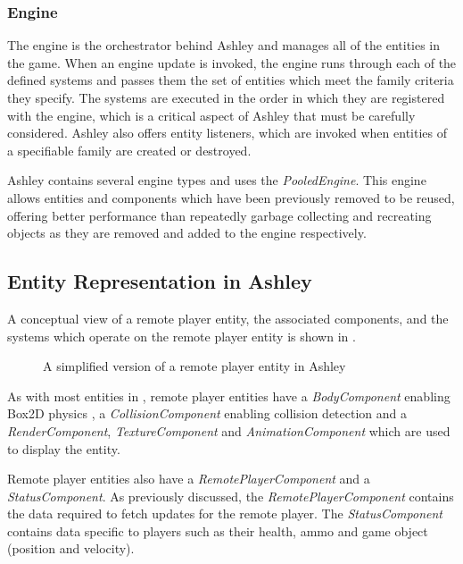 \subsubsection{Engine}
The engine is the orchestrator behind Ashley and manages all of the entities in the game. When an engine update is invoked, the engine runs through each of the defined systems and passes them the set of entities which meet the family criteria they specify. The systems are executed in the order in which they are registered with the engine, which is a critical aspect of Ashley that must be carefully considered. Ashley also offers entity listeners, which are invoked when entities of a specifiable family are created or destroyed.

Ashley contains several engine types and \game{} uses the \textit{PooledEngine}. This engine allows entities and components  which have been previously removed to be reused, offering better performance than repeatedly garbage collecting and recreating objects as they are removed and added to the engine respectively. 
 
\subsection{Entity Representation in Ashley}
A conceptual view of a remote player entity, the associated components, and the systems which operate on the remote player entity is shown in . 

\begin{figure}[H]
    \centering
    \caption{A simplified version of a remote player entity in Ashley}
    \label{fig:impl:ashley}
\end{figure}

As with most entities in \game{}, remote player entities have a \textit{BodyComponent} enabling Box2D physics , a \textit{CollisionComponent} enabling collision detection and a \textit{RenderComponent}, \textit{TextureComponent} and \textit{AnimationComponent} which are used to display the entity. 

Remote player entities also have a \textit{RemotePlayerComponent} and a \textit{StatusComponent}. As previously discussed, the \textit{RemotePlayerComponent} contains the data required to fetch updates for the remote player. The \textit{StatusComponent} contains data specific to players such as their health, ammo and game object (position and velocity). 

